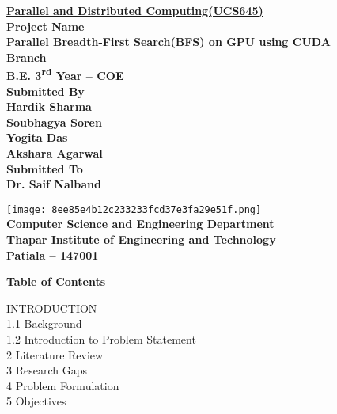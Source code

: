 \documentclass[a4paper,12pt]{article}
\begin{document}
\begin{center}
    {\Large\bfseries\underline{Parallel and Distributed Computing(UCS645)}}\\[20pt]

    {\Large\bfseries Project Name}\\[10pt]
    {\LARGE\bfseries Parallel Breadth-First Search(BFS) on GPU using CUDA}\\[20pt]

    {\Large\bfseries Branch}\\[10pt]
    {\Large\bfseries B.E. 3\textsuperscript{rd} Year – COE}\\[35pt]

    {\large\bfseries Submitted By}\\[5pt]
    {\large\bfseries Hardik Sharma}\\[5pt]
    {\large\bfseries Soubhagya Soren}\\[5pt]
    {\large\bfseries Yogita Das}\\[5pt]
     {\large\bfseries Akshara Agarwal}\\[90pt]

    {\large\bfseries Submitted To}\\[5pt]
{\large\bfseries Dr. Saif Nalband}\\[6pt]

\begin{center}
    \texttt{[image: 8ee85e4b12c233233fcd37e3fa29e51f.png]}\\[10pt]

    {\bfseries Computer Science and Engineering Department}\\[5pt]
    {\bfseries Thapar Institute of Engineering and Technology}\\[5pt]
    {\bfseries Patiala – 147001}
\end{center}
\newpage
\begin{center}
    \textbf{\large Table of Contents}
\end{center}
\vspace{1cm}

 \hspace{1em} INTRODUCTION  \\
1.1 \hspace{1em} Background  \\
1.2 \hspace{1em} Introduction to Problem Statement  \\

2 \hspace{1em} Literature Review  \\
3 \hspace{1em} Research Gaps  \\
4 \hspace{1em} Problem Formulation  \\
5 \hspace{1em} Objectives  \\


\end{center}
\end{document}
